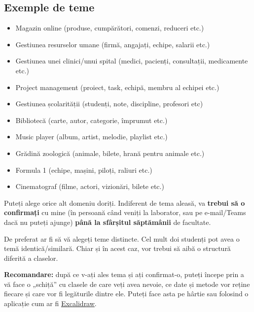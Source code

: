 \subsection*{Exemple de teme}
\begin{itemize}
    \item Magazin online (produse, cumpărători, comenzi, reduceri etc.)

    \item Gestiunea resurselor umane (firmă, angajați, echipe, salarii etc.)

    \item Gestiunea unei clinici/unui spital (medici, pacienți, consultații, medicamente etc.)

    \item Project management (proiect, task, echipă, membru al echipei etc.)

    \item Gestiunea școlarității (studenți, note, discipline, profesori etc)
    
    \item Bibliotecă (carte, autor, categorie, împrumut etc.)

    \item Music player (album, artist, melodie, playlist etc.)

    \item Grădină zoologică (animale, bilete, hrană pentru animale etc.)

    \item Formula 1 (echipe, mașini, piloți, raliuri etc.)

    \item Cinematograf (filme, actori, vizionări, bilete etc.)
\end{itemize}
Puteți alege orice alt domeniu doriți. Indiferent de tema aleasă, va \textbf{trebui să o confirmați} cu mine (în persoană când veniți la laborator, sau pe e-mail/Teams dacă nu puteți ajunge) \textbf{până la sfârșitul săptămânii \subjectchoosingdeadlineweek} de facultate.

De preferat ar fi să vă alegeți teme distincte. Cel mult doi studenți pot avea o temă identică/similară. Chiar și în acest caz, vor trebui să aibă o structură diferită a claselor.

\textbf{Recomandare:} după ce v-ați ales tema și ați confirmat-o, puteți începe prin a vă face o „schiță” cu clasele de care veți avea nevoie, ce date și metode vor reține fiecare și care vor fi legăturile dintre ele. Puteți face asta pe hârtie sau folosind o aplicație cum ar fi \href{https://excalidraw.com/}{Excalidraw}.

